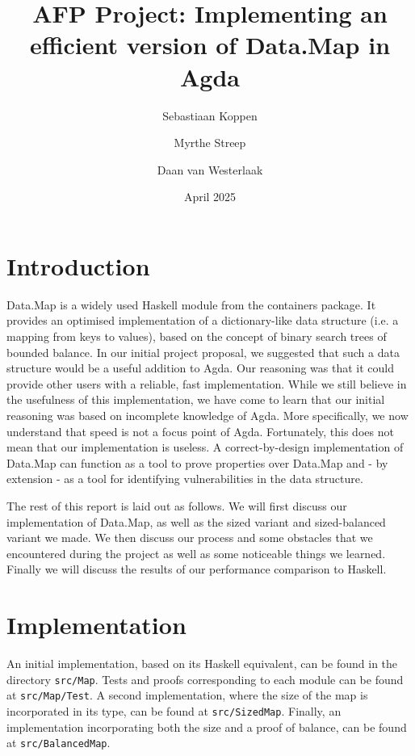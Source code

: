 \documentclass[a4paper,UKenglish,cleveref, autoref, thm-restate]{template/lipics-v2021}
\title{AFP Project: Implementing an efficient version of Data.Map in Agda}
\author{Sebastiaan Koppen}{Utrecht University, Netherlands}{}{}{}
\author{Myrthe Streep}{Utrecht University, Netherlands}{}{}{}
\author{Daan van Westerlaak}{Utrecht University, Netherlands}{}{}{}
\date{April 2025}
\begin{document}
\maketitle

\section{Introduction}
Data.Map is a widely used Haskell module from the containers package. It provides an optimised implementation of a dictionary-like data structure (i.e. a mapping from keys to values), based on the concept of binary search trees of bounded balance. In our initial project proposal, we suggested that such a data structure would be a useful addition to Agda. Our reasoning was that it could provide other users with a reliable, fast implementation. While we still believe in the usefulness of this implementation, we have come to learn that our initial reasoning was based on incomplete knowledge of Agda. More specifically, we now understand that speed is not a focus point of Agda. Fortunately, this does not mean that our implementation is useless. A correct-by-design implementation of Data.Map can function as a tool to prove properties over Data.Map and - by extension - as a tool for identifying vulnerabilities in the data structure.

The rest of this report is laid out as follows. We will first discuss our implementation of Data.Map, as well as the sized variant and sized-balanced variant we made. We then discuss our process and some obstacles that we encountered during the project as well as some noticeable things we learned. Finally we will discuss the results of our performance comparison to Haskell.


\section{Implementation}
An initial implementation, based on its Haskell equivalent, can be found in the directory \texttt{src/Map}. Tests and proofs corresponding to each module can be found at \texttt{src/Map/Test}. A second implementation, where the size of the map is incorporated in its type, can be found at \texttt{src/SizedMap}. Finally, an implementation incorporating both the size and a proof of balance, can be found at \texttt{src/BalancedMap}.
\end{document}
